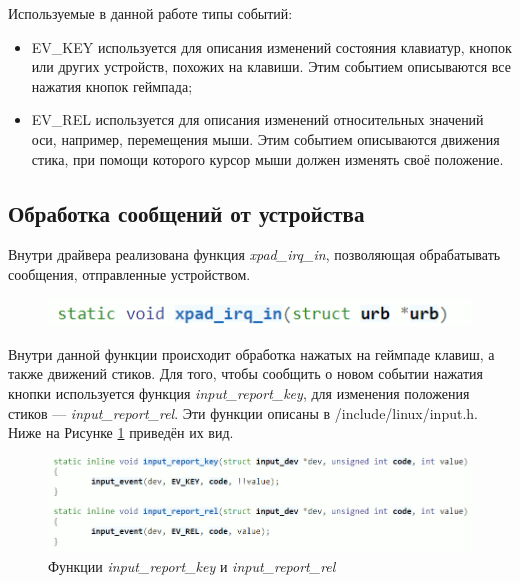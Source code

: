 Используемые в данной работе типы событий:
\begin{itemize}
	\item EV\_KEY используется для описания изменений состояния клавиатур,
	 кнопок или других устройств, похожих на клавиши. Этим событием описываются все нажатия кнопок геймпада;
	\item EV\_REL используется для описания изменений относительных значений оси, например, перемещения мыши.
	Этим событием описываются движения стика, при помощи которого курсор мыши должен изменять своё положение.
\end{itemize}\par


\subsection{Обработка сообщений от устройства}
Внутри драйвера реализована функция \textit{xpad\_irq\_in},
позволяющая обрабатывать сообщения, отправленные устройством.
\begin{figure}[h!]
	\centering
	\includegraphics[scale=1]{img/xpad-irq-in.png}
\end{figure}\par
Внутри данной функции происходит обработка нажатых на геймпаде клавиш, а также движений стиков.
Для того, чтобы сообщить о новом событии нажатия кнопки используется функция \textit{input\_report\_key},
для изменения положения стиков --- \textit{input\_report\_rel}. Эти функции описаны в /include/linux/input.h.
Ниже на Рисунке \ref{input_report} приведён их вид.

\begin{figure}[h!]
	\centering
	\includegraphics[scale=0.9]{img/input-report.png}
	\caption{Функции \textit{input\_report\_key} и \textit{input\_report\_rel}}
	\label{input_report}
\end{figure}\par
\newpage

